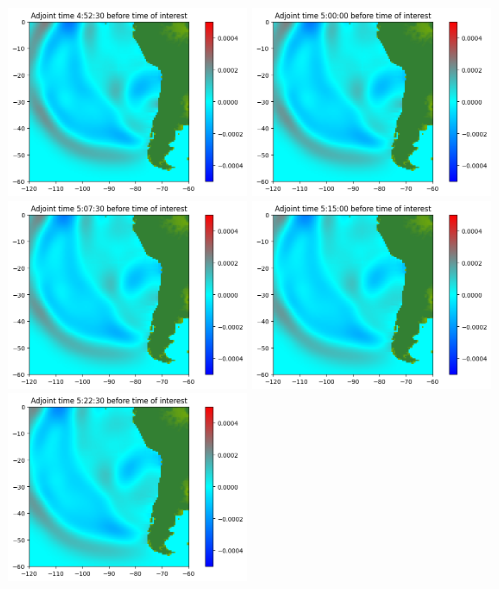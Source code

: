\documentclass[11pt]{article}
\begin{document}
\vskip 10pt 
\includegraphics[width=0.475\textwidth]{frame0039fig0.png}
\vskip 10pt 
\includegraphics[width=0.475\textwidth]{frame0040fig0.png}
\vskip 10pt 
\includegraphics[width=0.475\textwidth]{frame0041fig0.png}
\vskip 10pt 
\includegraphics[width=0.475\textwidth]{frame0042fig0.png}
\vskip 10pt 
\includegraphics[width=0.475\textwidth]{frame0043fig0.png}
\end{document}
